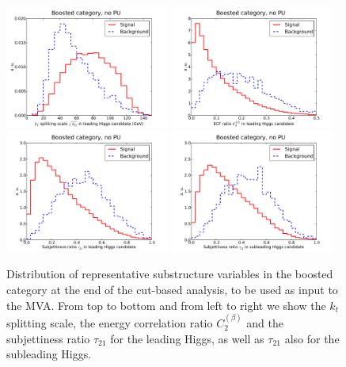 \begin{figure}[t]
  \begin{center}
    \includegraphics[width=0.48\textwidth]{plots/split12_h1_C1_boost.pdf} 
  \includegraphics[width=0.48\textwidth]{plots/EEC_C2_h0_C1_boost.pdf}
  \includegraphics[width=0.48\textwidth]{plots/tau21_h0_C1_boost.pdf}
  \includegraphics[width=0.48\textwidth]{plots/tau21_h1_C1_boost.pdf}
  \caption{\small Distribution of representative substructure variables
    in the boosted category at the end of the cut-based
    analysis, to be used as input to the MVA.
    From top to bottom and from left to right we show  the
    $k_t$ splitting scale, the energy correlation ratio $C_2^{(\beta)}$
    and the  subjettiness ratio $\tau_{21}$ for the leading
    Higgs, as well as $\tau_{21}$ also for the subleading Higgs.
}
\label{fig:mva_substructure_1}
\end{center}
\end{figure}


